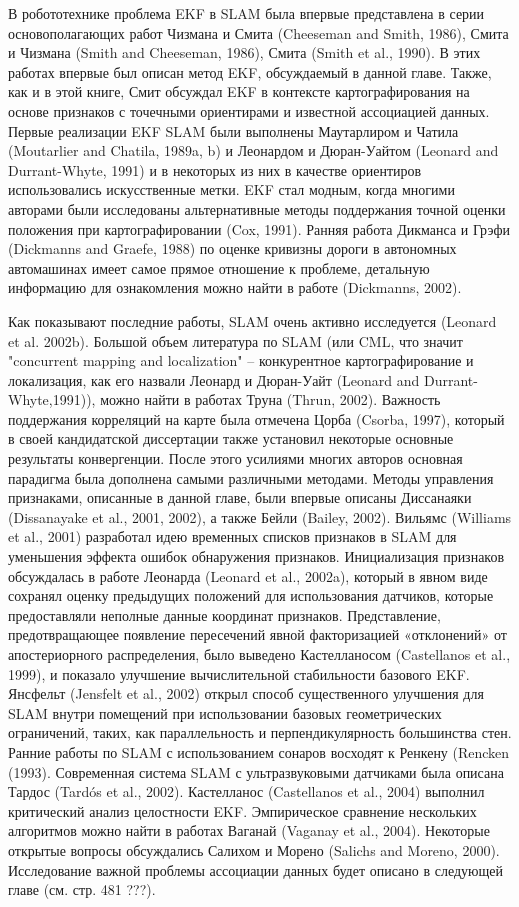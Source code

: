 \documentclass[10pt,a4paper]{article}
\begin{document}
В робототехнике проблема EKF в SLAM была впервые представлена в серии основополагающих работ Чизмана и Смита (Cheeseman and Smith, 1986), Смита и Чизмана (Smith and Cheeseman, 1986), Смита (Smith et al., 1990). В этих работах впервые был описан метод EKF, обсуждаемый в данной главе. Также, как и в этой книге, Смит обсуждал EKF в контексте картографирования на основе признаков с точечными ориентирами и известной ассоциацией данных. Первые реализации EKF SLAM были выполнены Маутарлиром и Чатила (Moutarlier and Chatila, 1989a, b) и Леонардом и Дюран-Уайтом (Leonard and Durrant-Whyte, 1991) и в некоторых из них в качестве ориентиров использовались искусственные метки. EKF стал модным, когда многими авторами были исследованы альтернативные методы поддержания точной оценки положения при картографировании (Cox, 1991). Ранняя работа Дикманса и Грэфи (Dickmanns and Graefe, 1988) по оценке кривизны дороги в автономных автомашинах имеет самое прямое отношение к проблеме, детальную информацию для ознакомления можно найти в работе (Dickmanns, 2002).

Как показывают последние работы, SLAM очень активно исследуется (Leonard et al. 2002b). Большой объем литература по SLAM (или CML, что значит "concurrent mapping and localization" – конкурентное картографирование и локализация, как его назвали Леонард и Дюран-Уайт (Leonard and Durrant-Whyte,1991)), можно найти в работах Труна (Thrun, 2002). Важность поддержания корреляций на карте была отмечена Цорба (Csorba, 1997), который в своей кандидатской диссертации также установил некоторые основные результаты конвергенции. После этого усилиями многих авторов основная парадигма была дополнена самыми различными методами. Методы управления признаками, описанные в данной главе, были впервые описаны Диссанаяки (Dissanayake et al., 2001, 2002), а также Бейли (Bailey, 2002). Вильямс (Williams et al., 2001) разработал идею временных списков признаков в SLAM для уменьшения эффекта ошибок обнаружения признаков. Инициализация признаков обсуждалась в работе Леонарда (Leonard et al., 2002a), который в явном виде сохранял оценку предыдущих положений для использования датчиков, которые предоставляли неполные данные координат признаков. Представление, предотвращающее появление пересечений явной факторизацией «отклонений» от апостериорного распределения, было выведено Кастелланосом (Castellanos et al., 1999), и показало улучшение вычислительной стабильности базового EKF. Янсфельт (Jensfelt et al., 2002) открыл способ существенного улучшения для SLAM внутри помещений при использовании базовых геометрических ограничений, таких, как параллельность и перпендикулярность большинства стен.  Ранние работы по SLAM с использованием сонаров восходят к Ренкену (Rencken (1993). Современная система SLAM с ультразвуковыми датчиками была описана Тардос (Tardós et al., 2002). Кастелланос (Castellanos et al., 2004) выполнил критический анализ целостности EKF. Эмпирическое сравнение нескольких алгоритмов можно найти в работах Ваганай (Vaganay et al., 2004). Некоторые открытые вопросы обсуждались Салихом и Морено (Salichs and Moreno, 2000). Исследование важной проблемы ассоциации данных будет описано в следующей главе (см. стр. 481 ???).
\end{document}
